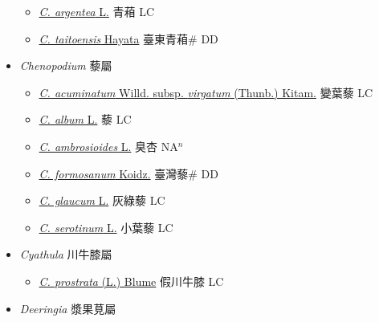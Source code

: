 \begin{itemize}
  \begin{itemize}
        \item[] \href{http://www.theplantlist.org/tpl1.1/search?q=Celosia+argentea}{\textit{C. argentea} L.}   青葙 LC
        \item[] \href{http://www.theplantlist.org/tpl1.1/search?q=Celosia+taitoensis}{\textit{C. taitoensis} Hayata}   臺東青葙\# DD
  \end{itemize}
 \item[] \textit{Chenopodium} 藜屬
                    
  \begin{itemize}
        \item[] \href{http://www.theplantlist.org/tpl1.1/search?q=Chenopodium+acuminatum+subsp.+virgatum}{\textit{C. acuminatum} Willd. subsp. \textit{virgatum} (Thunb.) Kitam.}   變葉藜 LC
        \item[] \href{http://www.theplantlist.org/tpl1.1/search?q=Chenopodium+album}{\textit{C. album} L.}   藜 LC
        \item[] \href{http://www.theplantlist.org/tpl1.1/search?q=Chenopodium+ambrosioides}{\textit{C. ambrosioides} L.}   臭杏 NA$^n$
        \item[] \href{http://www.theplantlist.org/tpl1.1/search?q=Chenopodium+formosanum}{\textit{C. formosanum} Koidz.}   臺灣藜\# DD
        \item[] \href{http://www.theplantlist.org/tpl1.1/search?q=Chenopodium+glaucum}{\textit{C. glaucum} L.}   灰綠藜 LC
        \item[] \href{http://www.theplantlist.org/tpl1.1/search?q=Chenopodium+serotinum}{\textit{C. serotinum} L.}   小葉藜 LC
  \end{itemize}
 \item[] \textit{Cyathula} 川牛膝屬
                    
  \begin{itemize}
        \item[] \href{http://www.theplantlist.org/tpl1.1/search?q=Cyathula+prostrata}{\textit{C. prostrata} (L.) Blume}   假川牛膝 LC
  \end{itemize}
 \item[] \textit{Deeringia} 漿果莧屬
                    

\end{itemize}
